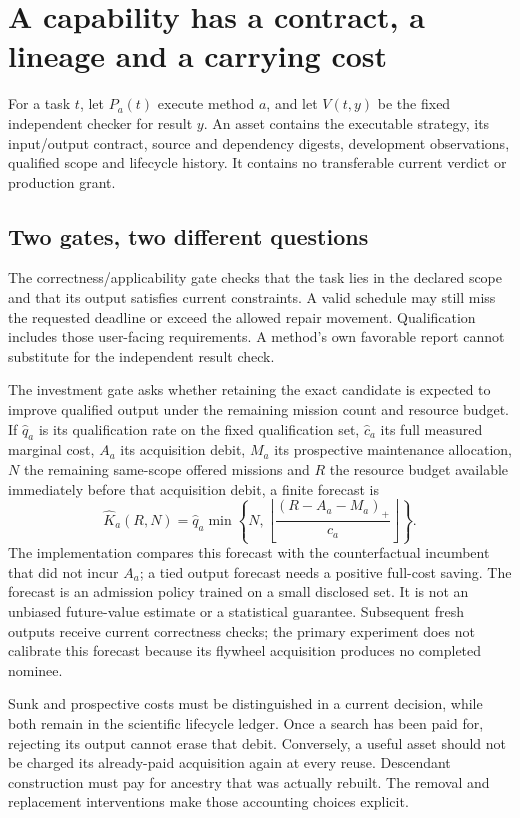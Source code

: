 \section{A capability has a contract, a lineage and a carrying cost}

For a task $t$, let $P_a(t)$ execute method $a$, and let $V(t,y)$ be the fixed independent checker for result $y$. An asset contains the executable strategy, its input/output contract, source and dependency digests, development observations, qualified scope and lifecycle history. It contains no transferable current verdict or production grant.

\subsection{Two gates, two different questions}

The correctness/applicability gate checks that the task lies in the declared scope and that its output satisfies current constraints. A valid schedule may still miss the requested deadline or exceed the allowed repair movement. Qualification includes those user-facing requirements. A method's own favorable report cannot substitute for the independent result check.

The investment gate asks whether retaining the exact candidate is expected to improve qualified output under the remaining mission count and resource budget. If $\hat q_a$ is its qualification rate on the fixed qualification set, $\hat c_a$ its full measured marginal cost, $A_a$ its acquisition debit, $M_a$ its prospective maintenance allocation, $N$ the remaining same-scope offered missions and $R$ the resource budget available immediately before that acquisition debit, a finite forecast is
\begin{equation}
 \widehat K_a(R,N)=\hat q_a\min\!\left\{N,\left\lfloor\frac{(R-A_a-M_a)_+}{\hat c_a}\right\rfloor\right\}.
\end{equation}
The implementation compares this forecast with the counterfactual incumbent that did not incur $A_a$; a tied output forecast needs a positive full-cost saving. The forecast is an admission policy trained on a small disclosed set. It is not an unbiased future-value estimate or a statistical guarantee. Subsequent fresh outputs receive current correctness checks; the primary experiment does not calibrate this forecast because its flywheel acquisition produces no completed nominee.

Sunk and prospective costs must be distinguished in a current decision, while both remain in the scientific lifecycle ledger. Once a search has been paid for, rejecting its output cannot erase that debit. Conversely, a useful asset should not be charged its already-paid acquisition again at every reuse. Descendant construction must pay for ancestry that was actually rebuilt. The removal and replacement interventions make those accounting choices explicit.

